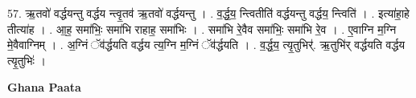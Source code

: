 \documentclass[17pt]{extarticle}
\begin{document}
57. ऋ॒तवो॑ वर्द्धयन्तु वर्द्धय न्त्वृ॒तव॑ ऋ॒तवो॑ वर्द्धयन्तु । . व॒र्द्ध॒य॒ न्त्वितीति॑ वर्द्धयन्तु वर्द्धय॒ न्त्विति॑ । . इत्या॑हा॒हे तीत्या॑ह । . आ॒ह॒ समा॑भिः॒ समा॑भि राहाह॒ समा॑भिः । . समा॑भि रे॒वैव समा॑भिः॒ समा॑भि रे॒व । . ए॒वाग्नि म॒ग्नि मे॒वैवाग्निम् । . अ॒ग्निं ॅव॑र्द्धयति वर्द्धय त्य॒ग्नि म॒ग्निं ॅव॑र्द्धयति । . व॒र्द्ध॒य॒ त्यृ॒तुभिर्॑. ऋ॒तुभि॑र् वर्द्धयति वर्द्धय त्यृ॒तुभिः॑ । \newline

\textbf{Ghana Paata } \newline
\end{document}
